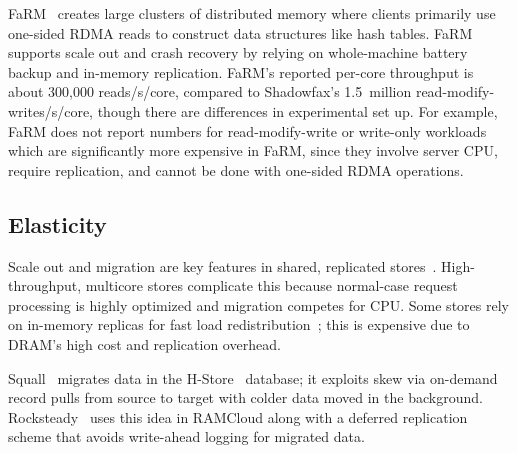 
FaRM~\cite{farm-2014,farm-txns} creates large clusters of distributed memory where
clients primarily use one-sided RDMA reads to construct data structures like
hash tables. FaRM supports scale out and crash recovery by relying on
whole-machine battery backup and in-memory replication.  FaRM's reported
per-core throughput is about 300,000 reads/s/core, compared to Shadowfax's
1.5~million read-modify-writes/s/core, though there are differences in
experimental set up. For example, FaRM does not report numbers for
read-modify-write or write-only workloads which are significantly more
expensive in FaRM, since they involve server CPU, require replication, and
cannot be done with one-sided RDMA operations.


\subsection{Elasticity}
Scale out and migration are key features in shared,
replicated stores~\cite{dynamo,cassandra,redis}.  High-throughput, multicore
stores complicate this because normal-case request processing is highly
optimized and migration competes for CPU.  Some stores rely on
in-memory replicas for fast load redistribution~\cite{farm-txns,drtmb};
this is expensive due to DRAM's high cost and
replication overhead.

Squall~\cite{squall} migrates data in the H-Store~\cite{hstore}
database; it exploits skew via on-demand record pulls from
source to target with colder data moved in the background.
Rocksteady~\cite{rocksteady} uses this idea in RAMCloud along with a
deferred replication scheme that avoids write-ahead logging for
migrated data.
